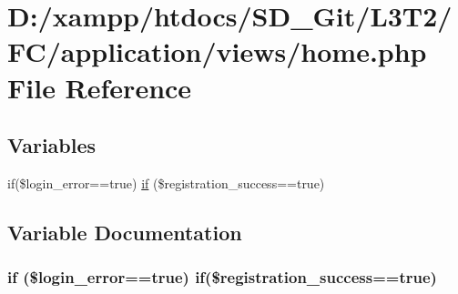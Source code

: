 \hypertarget{views_2_home_8php}{}\section{D\+:/xampp/htdocs/\+S\+D\+\_\+\+Git/\+L3\+T2/\+F\+C/application/views/home.php File Reference}
\label{views_2_home_8php}
\subsection*{Variables}
\begin{DoxyCompactItemize}
\item 
if(\$login\+\_\+error==true) \hyperlink{views_2_home_8php_a1a1fc1726253ea4522f69aed645d8d2e}{if} (\$registration\+\_\+success==true)
\end{DoxyCompactItemize}


\subsection{Variable Documentation}
\hypertarget{views_2_home_8php_a1a1fc1726253ea4522f69aed645d8d2e}{}
\subsubsection[{if}]{\setlength{\rightskip}{0pt plus 5cm}if (\$login\+\_\+error==true) if(\$registration\+\_\+success==true)}\label{views_2_home_8php_a1a1fc1726253ea4522f69aed645d8d2e}
